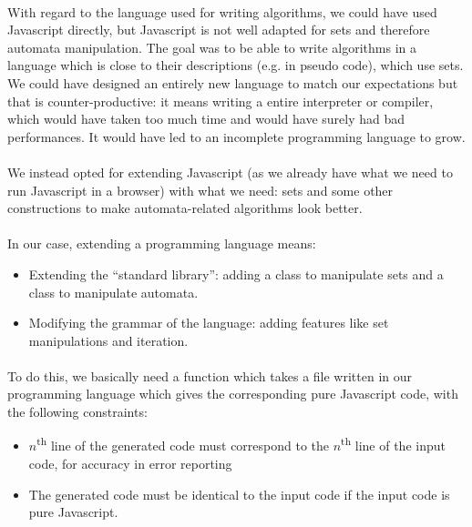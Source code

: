 \paragraph{}
With regard to the language used for writing algorithms, we could have used Javascript directly, but Javascript is not well adapted for sets and therefore automata manipulation. The goal was to be able to write algorithms in a language which is close to their descriptions (e.g. in pseudo code), which use sets. We could have designed an entirely new language to match our expectations but that is counter-productive: it means writing a entire interpreter or compiler, which would have taken too much time and would have surely had bad performances. It would have led to an incomplete programming language to grow.

\paragraph{}
We instead opted for extending Javascript (as we already have what we need to run Javascript in a browser) with what we need: sets and some other constructions to make automata-related algorithms look better.

      
\paragraph{}
In our case, extending a programming language means:
       
\begin{itemize}
   \item{ Extending the “standard library”: adding a class to manipulate sets and a class to manipulate automata.}
   \item{ Modifying the grammar of the language: adding features like set manipulations and iteration.}
\end{itemize}

\paragraph{}
To do this, we basically need a function which takes a file written in our programming language which gives the corresponding pure Javascript code, with the following constraints:
       
\begin{itemize}
   \item{ $ n $\textsuperscript{th} line  of the generated code must correspond to the $ n $\textsuperscript{th}  line of the input code, for accuracy in error reporting}
   \item{ The generated code must be identical to the input code if the input code is pure Javascript.}
\end{itemize}

